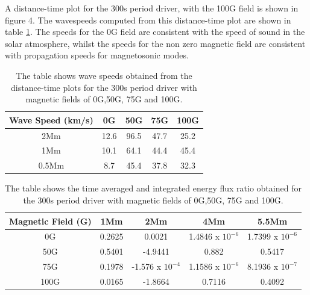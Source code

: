 \documentclass[linenumbers]{aastex63}
\begin{document}

A distance-time plot for the 300s period driver, with the 100G field is shown in figure 4. The wavespeeds computed from this distance-time plot are shown in table \ref{Tablewavespeeds_300s}. The speeds for the 0G field are consistent with the speed of sound in the solar atmosphere, whilst the speeds for the non zero magnetic field are consistent with propagation speeds for magnetosonic modes. 
\begin{table}\label{wavespeeds}
\centering
\begin{tabular}{c c c c c}
\hline
Wave Speed (km/s)   &  0G  &  50G &  75G & 100G\\
\hline
2Mm & 12.6  &   96.5       &   47.7      &  25.2     \\
\hline
1Mm & 10.1  &    64.1      &   44.4     &   45.4      \\
\hline
0.5Mm & 8.7  &   45.4      &   37.8      &   32.3    \\
\hline

\end{tabular} 
\caption{The table shows wave speeds obtained from the distance-time plots for the 300s period driver with magnetic fields of 0G,50G, 75G and 100G.}
\label{Tablewavespeeds_300s}
\end{table}

\begin{table}\label{energyflux}
\centering
\begin{tabular}{c c c c c}
\hline
Magnetic Field (G)   &  1Mm  &  2Mm &  4Mm & 5.5Mm \\
\hline
0G & 0.2625  &    0.0021      &   1.4846 x $10^{-6}$     &   1.7399 x $10^{-6}$      \\
\hline
50G & 0.5401  &   -4.9441       &   0.882      &  0.5417     \\
\hline
75G & 0.1978  &    -1.576 x $10^{-4}$      &   1.1586 x $10^{-6}$     &   8.1936 x $10^{-7}$      \\
\hline
100G & 0.0165  &   -1.8664      &   0.7116      &   0.4092    \\
\hline

\end{tabular} 
\caption{The table shows the time averaged and integrated energy flux ratio obtained  for the 300s period driver with magnetic fields of 0G,50G, 75G and 100G.}
\label{energyfluxratio}
\end{table}
\end{document}
